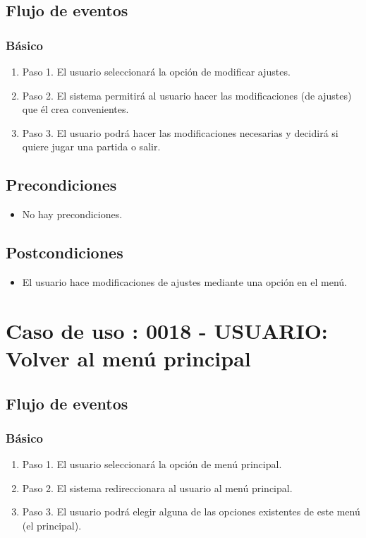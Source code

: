 \subsection{Flujo de eventos}
\subsubsection{Básico}

\begin{enumerate}
\item Paso 1.
El usuario seleccionará la opción de modificar ajustes. 
\item Paso 2.
El sistema permitirá al usuario hacer las modificaciones (de ajustes) que él crea convenientes. 
\item Paso 3.
El usuario podrá hacer las modificaciones necesarias y decidirá si quiere jugar una partida o salir.
\end{enumerate}

\subsection{Precondiciones}
\begin{itemize}
\item No hay precondiciones.
\end{itemize}

\subsection{Postcondiciones}
\begin{itemize}
\item El usuario hace modificaciones de ajustes mediante una opción en el menú.
\end{itemize}



\section{Caso de uso : 0018 - USUARIO: Volver al menú principal}\label{sec:uc0}
\subsection{Flujo de eventos}
\subsubsection{Básico}

\begin{enumerate}
\item Paso 1.
El usuario seleccionará la opción de menú principal. 
\item Paso 2.
El sistema redireccionara al usuario al menú principal. 
\item Paso 3.
El usuario podrá elegir alguna de las opciones existentes de este menú (el principal).
\end{enumerate}

